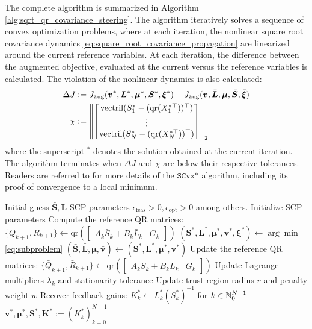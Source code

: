 \documentclass{IEEEtran}
\begin{document}
The complete algorithm is summarized in Algorithm \ref{alg:sqrt_qr_covariance_steering}. The algorithm iteratively solves a sequence of convex optimization problems, where at each iteration, the nonlinear square root covariance dynamics \eqref{eq:square_root_covariance_propagation} are linearized around the current reference variables. 
At each iteration, the difference between the augmented objective, evaluated at the current versus the reference variables is calculated. The violation of the nonlinear dynamics is also calculated:
\begin{align}
	\Delta J &:= J_{\mathrm{aug}}(\bm{v}^*, \bm{L}^*, \bm{\mu}^*, \bm{S}^*, \bm{\xi}^*) - J_{\mathrm{aug}}(\bar{\bm{v}}, \bar{\bm{L}}, \bar{\bm{\mu}}, \bar{\bm{S}}, \bar{\bm{\xi}}) \\
	\chi &:= \norm{\begin{bmatrix}
		\mathrm{vectril}(S_1^* - (\mathrm{qr}(X_1^{*\top}))^\top) \\
		\vdots \\
		\mathrm{vectril}(S_N^* - (\mathrm{qr}(X_N^{*\top}))^\top)
	\end{bmatrix}}_2
\end{align}
where the superscript $^*$ denotes the solution obtained at the current iteration.
The algorithm terminates when \(\Delta J\) and \(\chi\) are below their respective tolerances. Readers are referred to \cite{oguriSuccessiveConvexificationFeasibility2023a} for more details of the $\texttt{SCvx*}$ algorithm, including its proof of convergence to a local minimum.


\begin{algorithm}[ht]
\caption{Square Root QR Covariance Steering via \texttt{SCvx*}}
\label{alg:sqrt_qr_covariance_steering}
\begin{algorithmic}[1]
\Require Initial guess $\bar{\bm{S}}, \bar{\bm{L}}$
\Require SCP parameters \(\epsilon_{\mathrm{feas}} > 0, \epsilon_{\mathrm{opt}} > 0\) among others.
\State Initialize SCP parameters
\State Compute the reference QR matrices: $\{\bar{Q}_{k+1}, \bar{R}_{k+1}\} \gets \mathrm{qr}(\begin{bmatrix} A_k \bar{S}_k + B_k \bar{L}_k & G_k \end{bmatrix})$
	\State $(\bm{S}^*, \bm{L}^*, \bm{\mu}^*, \bm{v}^*, \bm{\xi}^*) \gets \arg\min$ \eqref{eq:subproblem}
		\State $(\bar{\bm{S}}, \bar{\bm{L}}, \bar{\bm{\mu}}, \bar{\bm{v}}) \gets (\bm{S}^*, \bm{L}^*, \bm{\mu}^*, \bm{v}^*)$ 
		\State Update the reference QR matrices: $\{\bar{Q}_{k+1}, \bar{R}_{k+1}\} \gets \mathrm{qr}(\begin{bmatrix} A_k \bar{S}_k + B_k \bar{L}_k & G_k \end{bmatrix})$
		\State Update Lagrange multipliers \(\lambda_k\) and stationarity tolerance
	\EndIf
	\State Update trust region radius \(r\) and penalty weight \(w\)
\EndWhile
\State Recover feedback gains: $K_k^* \gets L_k^* (S_k^*)^{-1}$ for $k \in \mathbb{N}_{0}^{N-1}$
\State \Return $\bm{v}^*, \bm{\mu}^*, \bm{S}^*, \bm{K}^* := (K_k^*)_{k=0}^{N-1}$
\end{algorithmic}
\end{algorithm}
\end{document}
